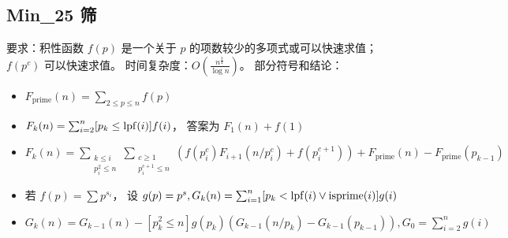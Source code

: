 \subsection{Min\_25 筛}
要求：积性函数 $f(p)$ 是一个关于 $p$ 的项数较少的多项式或可以快速求值；$f(p^{c})$ 可以快速求值。
时间复杂度：$O\left(\frac{n^{\frac{3}{4}}}{\log{n}}\right)$。
部分符号和结论：
\begin{itemize}
\item $F_{\mathrm{prime}}(n) = \sum_{2 \le p \le n} f(p)$
\item $F_{k}(n) = \sum_{i = 2}^{n} [p_{k} \le \operatorname{lpf}(i)] f(i)$，
  答案为 $F_{1}(n) + f(1)$
\item $F_{k}(n) = \sum_{\substack{k \le i \\ p_{i}^{2} \le n}} \sum_{\substack{c \ge 1 \\ p_{i}^{c + 1} \le n}} (f(p_{i}^{c}) F_{i + 1}(n / p_{i}^{c}) +
  f(p_{i}^{c + 1})) + F_{\mathrm{prime}}(n) - F_{\mathrm{prime}}(p_{k - 1})$
\item 若 $f(p) = \sum p^{s_{i}}$，
  设 $g(p) = p^{s}, G_{k}(n) = \sum_{i = 1}^{n} [p_{k} < \operatorname{lpf}(i) \lor \operatorname{isprime}(i)] g(i)$
\item $G_{k}(n) = G_{k - 1}(n) - [p_{k}^{2} \le n] g(p_{k}) (G_{k - 1}(n / p_{k}) - G_{k - 1}(p_{k - 1})), G_{0} = \sum_{i = 2}^{n} g(i)$
\end{itemize}

